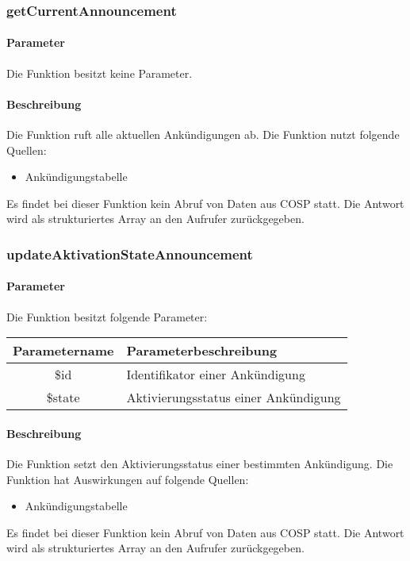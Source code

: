 \subsubsection{getCurrentAnnouncement}
\paragraph{Parameter} Die Funktion besitzt keine Parameter.
\paragraph{Beschreibung} Die Funktion ruft alle aktuellen Ankündigungen ab. Die Funktion nutzt folgende Quellen:
\begin{itemize}
	\item Ankündigungstabelle
\end{itemize}
Es findet bei dieser Funktion kein Abruf von Daten aus {\glqq COSP\grqq} statt. Die Antwort wird als strukturiertes Array an den Aufrufer zurückgegeben.
\subsubsection{updateAktivationStateAnnouncement}
\paragraph{Parameter} Die Funktion besitzt folgende Parameter:
\begin{table}[H]
	\begin{tabular}{|c|p{11cm}|}
		\hline
		\textbf{Parametername} & \textbf{Parameterbeschreibung} \\ \hline
		\$id    & Identifikator einer Ankündigung \\ \hline
		\$state & Aktivierungsstatus einer Ankündigung \\ \hline
	\end{tabular}
\end{table}
\paragraph{Beschreibung} Die Funktion setzt den Aktivierungsstatus einer bestimmten Ankündigung. Die Funktion hat Auswirkungen auf folgende Quellen:
\begin{itemize}
	\item Ankündigungstabelle
\end{itemize}
Es findet bei dieser Funktion kein Abruf von Daten aus {\glqq COSP\grqq} statt. Die Antwort wird als strukturiertes Array an den Aufrufer zurückgegeben.